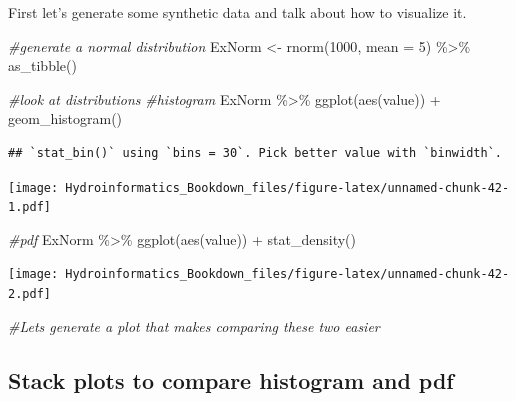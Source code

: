 \documentclass[
]{book}
\newenvironment{Shaded}{\begin{snugshade}}{\end{snugshade}}
\newcommand{\AttributeTok}[1]{\textcolor[rgb]{0.77,0.63,0.00}{#1}}
\newcommand{\CommentTok}[1]{\textcolor[rgb]{0.56,0.35,0.01}{\textit{#1}}}
\newcommand{\DecValTok}[1]{\textcolor[rgb]{0.00,0.00,0.81}{#1}}
\newcommand{\FunctionTok}[1]{\textcolor[rgb]{0.00,0.00,0.00}{#1}}
\newcommand{\NormalTok}[1]{#1}
\newcommand{\OtherTok}[1]{\textcolor[rgb]{0.56,0.35,0.01}{#1}}
\newcommand{\SpecialCharTok}[1]{\textcolor[rgb]{0.00,0.00,0.00}{#1}}
\begin{document}
First let's generate some synthetic data and talk about how to visualize it.

\begin{Shaded}
\begin{Highlighting}[]
\CommentTok{\#generate a normal distribution}
\NormalTok{ExNorm }\OtherTok{\textless{}{-}} \FunctionTok{rnorm}\NormalTok{(}\DecValTok{1000}\NormalTok{, }\AttributeTok{mean =} \DecValTok{5}\NormalTok{) }\SpecialCharTok{\%\textgreater{}\%} 
  \FunctionTok{as\_tibble}\NormalTok{()}

\CommentTok{\#look at distributions}
\CommentTok{\#histogram}
\NormalTok{ExNorm }\SpecialCharTok{\%\textgreater{}\%}
  \FunctionTok{ggplot}\NormalTok{(}\FunctionTok{aes}\NormalTok{(value)) }\SpecialCharTok{+}
  \FunctionTok{geom\_histogram}\NormalTok{()}
\end{Highlighting}
\end{Shaded}

\begin{verbatim}
## `stat_bin()` using `bins = 30`. Pick better value with `binwidth`.
\end{verbatim}

\texttt{[image: Hydroinformatics\_Bookdown\_files/figure-latex/unnamed-chunk-42-1.pdf]}

\begin{Shaded}
\begin{Highlighting}[]
\CommentTok{\#pdf}
\NormalTok{ExNorm }\SpecialCharTok{\%\textgreater{}\%}
  \FunctionTok{ggplot}\NormalTok{(}\FunctionTok{aes}\NormalTok{(value)) }\SpecialCharTok{+}
  \FunctionTok{stat\_density}\NormalTok{()}
\end{Highlighting}
\end{Shaded}

\texttt{[image: Hydroinformatics\_Bookdown\_files/figure-latex/unnamed-chunk-42-2.pdf]}

\begin{Shaded}
\begin{Highlighting}[]
\CommentTok{\#Let\textquotesingle{}s generate a plot that makes comparing these two easier}
\end{Highlighting}
\end{Shaded}

\hypertarget{stack-plots-to-compare-histogram-and-pdf}{%
\subsection{Stack plots to compare histogram and pdf}\label{stack-plots-to-compare-histogram-and-pdf}}
\end{document}
